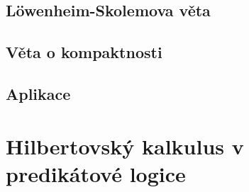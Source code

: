 \subsection{Löwenheim-Skolemova věta}


\subsection{Věta o kompaktnosti}

\subsection{Aplikace}


\section{Hilbertovský kalkulus v predikátové logice}

\todo